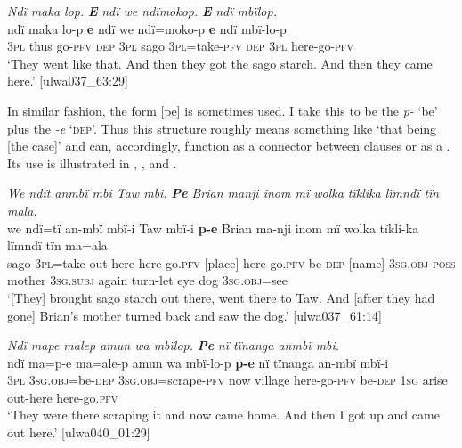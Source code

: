 \ea%
    \label{ex:complex:74}
          \textit{Ndï maka lop.} \textbf{\textit{E}} \textit{ndï we ndïmokop.} \textbf{\textit{E}} \textit{ndï mbïlop.}\\
\gll    ndï  maka  lo-p  \textbf{e}    ndï   we    ndï=moko-p  \textbf{e}    ndï     mbï-lo-p\\
    \textsc{3pl}  thus  go-\textsc{pfv}  \textsc{dep}  \textsc{3pl}    sago  \textsc{3pl=}take\textsc{{}-pfv}  \textsc{dep}  \textsc{3pl}    here-go-\textsc{pfv}\\
\glt `They went like that. And then they got the sago starch. And then they came here.’ [ulwa037\_63:29]
\z

In similar fashion, the form [pe] is sometimes used. I take this to be the  \textit{p-} ‘be’ plus the  \textit{-e} ‘\textsc{dep}’. Thus this structure roughly means something like ‘that being [the case]’ and can, accordingly, function as a connector between clauses or as a  . Its use is illustrated in , , and .


\ea%
    \label{ex:complex:75}
          \textit{We ndït anmbï mbi Taw mbi.} \textbf{\textit{Pe}} \textit{Brian manji inom mï wolka tïklika lïmndï tïn mala.}\\
\gll    we    ndï=tï    an-mbï    mbï-i      Taw  mbï-i \textbf{p-e}    Brian  ma-nji      inom  mï      wolka  tïkli-ka     lïmndï  tïn    ma=ala\\
    sago  3\textsc{pl}=take  out-here  here-go.\textsc{pfv}  [place]  here-go.\textsc{pfv}    be-\textsc{dep}  [name]  3\textsc{sg.obj-poss}  mother  \textsc{3sg.subj}  again  turn-let    eye    dog  3\textsc{sg.obj}=see\\
\glt `[They] brought sago starch out there, went there to Taw. And [after they had gone] Brian’s mother turned back and saw the dog.’ [ulwa037\_61:14]
\z

\ea%
    \label{ex:complex:76}
          \textit{Ndï mape malep amun wa mbïlop.} \textbf{\textit{Pe}} \textit{nï tïnanga anmbï mbi.}\\
\gll    ndï  ma=p-e      ma=ale-p        amun  wa mbï-lo-p    \textbf{p-e}    nï    tïnanga  an-mbï    mbï-i\\
    3\textsc{pl}  \textsc{3sg.obj=}be\textsc{{}-dep} 3\textsc{sg.obj}=scrape\textsc{{}-pfv} now  village    here-go-\textsc{pfv}  be-\textsc{dep}  \textsc{1sg}  arise  out-here  here-go.\textsc{pfv}\\
\glt `They were there scraping it and now came home. And then I got up and came out here.’ [ulwa040\_01:29]
\z

